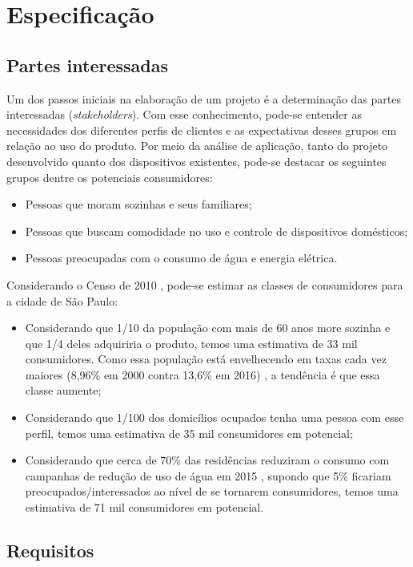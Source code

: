 \chapter{Especificação}

\section{Partes interessadas}
Um dos passos iniciais na elaboração de um projeto é a determinação das partes interessadas (\emph{stakeholders}). Com esse conhecimento, pode-se entender as necessidades dos diferentes perfis de clientes e as expectativas desses grupos em relação ao uso do produto. Por meio da análise de aplicação, tanto do projeto desenvolvido quanto dos dispositivos existentes, pode-se destacar os seguintes grupos dentre os potenciais consumidores:

\begin{itemize}
\item Pessoas que moram sozinhas e seus familiares;
\item Pessoas que buscam comodidade no uso e controle de dispositivos domésticos;
\item Pessoas preocupadas com o consumo de água e energia elétrica.
\end{itemize}

Considerando o Censo de 2010 \cite{ibge}, pode-se estimar as classes de consumidores para a cidade de São Paulo:

\begin{itemize}
\item Considerando que 1/10 da população com mais de 60 anos more sozinha e que 1/4 deles adquiriria o produto, temos uma estimativa de 33 mil consumidores. Como essa população está envelhecendo em taxas cada vez maiores (8,96\% em 2000 contra 13,6\% em 2016) \cite{bibliotecaVirtual}, a tendência é que essa classe aumente;
\item Considerando que 1/100 dos domicílios ocupados tenha uma pessoa com esse perfil, temos uma estimativa de 35 mil consumidores em potencial;
\item Considerando que cerca de 70\% das residências reduziram o consumo com campanhas de redução de uso de água em 2015 \cite{g1}, supondo que 5\% ficariam preocupados/interessados ao nível de se tornarem consumidores, temos uma estimativa de 71 mil consumidores em potencial.
\end{itemize}

\section{Requisitos \label{sec:requisitos}}

